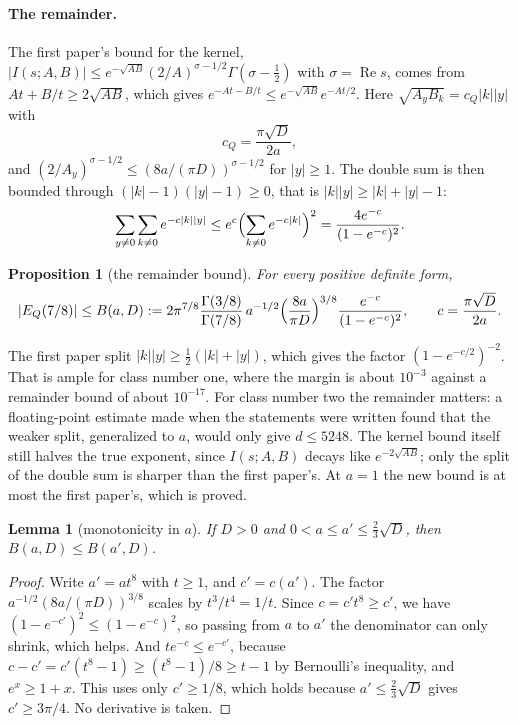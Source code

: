 \documentclass[11pt]{article}
\newtheorem{proposition}[theorem]{Proposition}
\newtheorem{lemma}[theorem]{Lemma}
\theoremstyle{definition}
\newcommand{\re}{\operatorname{Re}}
\begin{document}
{\paragraph{The remainder.} The first paper's bound for the kernel, $|I(s; A, B)| \le e^{-\sqrt{AB}}(2/A)^{\sigma - 1/2}\Gamma(\sigma - \frac12)$ with $\sigma = \re s$, comes from $At + B/t \ge 2\sqrt{AB}$, which gives $e^{-At - B/t} \le e^{-\sqrt{AB}}e^{-At/2}$. Here $\sqrt{A_yB_k} = c_Q|k||y|$ with
\[
c_Q = \frac{\pi\sqrt D}{2a},
\]
and $(2/A_y)^{\sigma - 1/2} \le (8a/(\pi D))^{\sigma - 1/2}$ for $|y| \ge 1$. The double sum is then bounded through $(|k| - 1)(|y| - 1) \ge 0$, that is $|k||y| \ge |k| + |y| - 1$:
\[
\sum_{y \ne 0}\sum_{k \ne 0} e^{-c|k||y|} \le e^{c}\Bigl(\sum_{k \ne 0}e^{-c|k|}\Bigr)^2 = \frac{4e^{-c}}{(1 - e^{-c})^2} .
\]

\begin{proposition}[the remainder bound]\label{prop:Bg}
For every positive definite form,
\[
|E_Q(7/8)| \le B(a, D) := 2\pi^{7/8}\frac{\Gamma(3/8)}{\Gamma(7/8)}\,a^{-1/2}\Bigl(\frac{8a}{\pi D}\Bigr)^{3/8}\frac{e^{-c}}{(1 - e^{-c})^2}, \qquad c = \frac{\pi\sqrt D}{2a}.
\]
\end{proposition}

The first paper split $|k||y| \ge \frac12(|k| + |y|)$, which gives the factor $(1 - e^{-c/2})^{-2}$. That is ample for class number one, where the margin is about $10^{-3}$ against a remainder bound of about $10^{-17}$. For class number two the remainder matters: a floating-point estimate made when the statements were written found that the weaker split, generalized to $a$, would only give $d \le 5248$. The kernel bound itself still halves the true exponent, since $I(s; A, B)$ decays like $e^{-2\sqrt{AB}}$; only the split of the double sum is sharper than the first paper's. At $a = 1$ the new bound is at most the first paper's, which is proved.

\begin{lemma}[monotonicity in $a$]\label{lem:mono}
If $D > 0$ and $0 < a \le a' \le \frac23\sqrt D$, then $B(a, D) \le B(a', D)$.
\end{lemma}

\begin{proof}
Write $a' = at^8$ with $t \ge 1$, and $c' = c(a')$. The factor $a^{-1/2}(8a/(\pi D))^{3/8}$ scales by $t^3/t^4 = 1/t$. Since $c = c't^8 \ge c'$, we have $(1 - e^{-c'})^2 \le (1 - e^{-c})^2$, so passing from $a$ to $a'$ the denominator can only shrink, which helps. And $te^{-c} \le e^{-c'}$, because $c - c' = c'(t^8 - 1) \ge (t^8 - 1)/8 \ge t - 1$ by Bernoulli's inequality, and $e^{x} \ge 1 + x$. This uses only $c' \ge 1/8$, which holds because $a' \le \frac23\sqrt D$ gives $c' \ge 3\pi/4$. No derivative is taken.
\end{proof}

}
\end{document}
